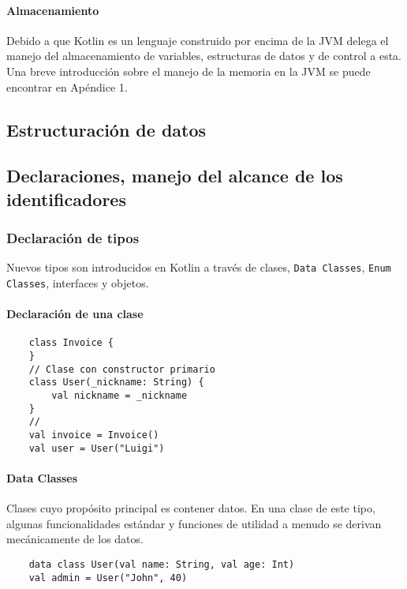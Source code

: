 \paragraph{Almacenamiento} Debido a que Kotlin es un lenguaje construido por encima de la JVM delega el manejo del almacenamiento de variables, estructuras de datos y de control a esta. Una breve introducción sobre el manejo de la memoria en la JVM se puede encontrar en Apéndice 1.
 
\subsection{Estructuración de datos}

\subsection{Declaraciones, manejo del alcance de los identificadores} \label{sec:declaraciones}

\subsubsection{Declaración de tipos}
Nuevos tipos son introducidos en Kotlin a través de clases, \texttt{Data Classes}, \texttt{Enum Classes}, interfaces y objetos.

\paragraph{Declaración de una clase}
\begin{verbatim}
    class Invoice {
    }
    // Clase con constructor primario
    class User(_nickname: String) {
        val nickname = _nickname
    }
    // 
    val invoice = Invoice()
    val user = User("Luigi")    
\end{verbatim}

\paragraph{Data Classes} Clases cuyo propósito principal es contener datos. En una clase de este tipo, algunas funcionalidades estándar y funciones de utilidad a menudo se derivan mecánicamente de los datos.
\begin{verbatim}
    data class User(val name: String, val age: Int)
    val admin = User("John", 40)
\end{verbatim}

